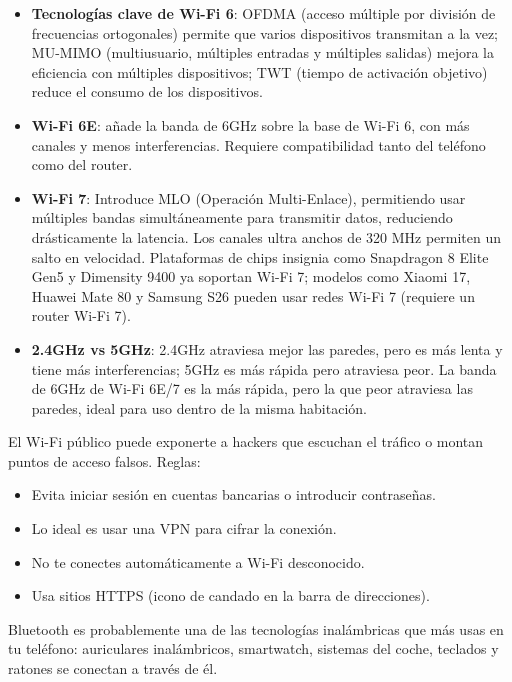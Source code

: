 \begin{itemize}
  \item \textbf{Tecnologías clave de Wi-Fi 6}: OFDMA (acceso múltiple por división de frecuencias ortogonales) permite que varios dispositivos transmitan a la vez; MU-MIMO (multiusuario, múltiples entradas y múltiples salidas) mejora la eficiencia con múltiples dispositivos; TWT (tiempo de activación objetivo) reduce el consumo de los dispositivos.
  \item \textbf{Wi-Fi 6E}: añade la banda de 6GHz sobre la base de Wi-Fi 6, con más canales y menos interferencias. Requiere compatibilidad tanto del teléfono como del router.
  \item \textbf{Wi-Fi 7}: Introduce MLO (Operación Multi-Enlace), permitiendo usar múltiples bandas simultáneamente para transmitir datos, reduciendo drásticamente la latencia. Los canales ultra anchos de 320 MHz permiten un salto en velocidad. Plataformas de chips insignia como Snapdragon 8 Elite Gen5 y Dimensity 9400 ya soportan Wi-Fi 7; modelos como Xiaomi 17, Huawei Mate 80 y Samsung S26 pueden usar redes Wi-Fi 7 (requiere un router Wi-Fi 7).
  \item \textbf{2.4GHz vs 5GHz}: 2.4GHz atraviesa mejor las paredes, pero es más lenta y tiene más interferencias; 5GHz es más rápida pero atraviesa peor. La banda de 6GHz de Wi-Fi 6E/7 es la más rápida, pero la que peor atraviesa las paredes, ideal para uso dentro de la misma habitación.
\end{itemize}


El Wi-Fi público puede exponerte a hackers que escuchan el tráfico o montan puntos de acceso falsos. Reglas:

\begin{itemize}
  \item Evita iniciar sesión en cuentas bancarias o introducir contraseñas.
  \item Lo ideal es usar una VPN para cifrar la conexión.
  \item No te conectes automáticamente a Wi-Fi desconocido.
  \item Usa sitios HTTPS (icono de candado en la barra de direcciones).
\end{itemize}


Bluetooth es probablemente una de las tecnologías inalámbricas que más usas en tu teléfono: auriculares inalámbricos, smartwatch, sistemas del coche, teclados y ratones se conectan a través de él.


